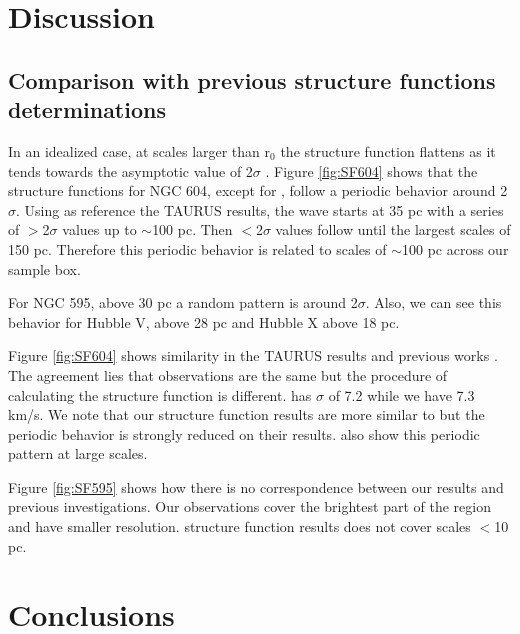 \documentclass[fleqn,usenatbib]{mnras}
\begin{document}
\clearpage


\section{Discussion}\label{sec:disc}

\subsection{Comparison with previous structure functions determinations}

In an idealized case, at scales larger than r$_{0}$ the structure function flattens as it tends towards the asymptotic value of 2$\sigma$ \citep{arthur2016turbulence}. Figure \ref{fig:SF604} shows that the structure functions for NGC 604, except for \cite{2019arXiv191203543M}, follow a periodic behavior around 2$\sigma$. Using as reference the TAURUS results, the wave starts at 35 pc with a series of $ >$2$\sigma$ values up to $\sim$100 pc. Then $<$2$\sigma$ values follow until the largest scales of 150 pc. Therefore this periodic behavior is related to scales of $\sim$100 pc across our sample box. 

For NGC 595, above 30 pc a random pattern is around 2$\sigma$. Also, we can see this behavior for Hubble V, above 28 pc and Hubble X above 18 pc.

Figure \ref{fig:SF604} shows similarity in the TAURUS results and previous works \citep{tanco1997,2019arXiv191203543M}. The agreement lies that observations are the same but the procedure of calculating the structure function is different. \citep{2019arXiv191203543M} has $\sigma$ of 7.2 while we have 7.3 km/s. We note that our structure function results are more similar to \cite{2019arXiv191203543M} but the periodic behavior is strongly reduced on their results. \citep{tanco1997} also show this periodic pattern at large scales.

Figure \ref{fig:SF595} shows how there is no correspondence between our results and previous investigations. Our observations cover the brightest part of the region and have smaller resolution. \citet{lagrois2011} structure function results does not cover scales $<$10 pc.



\section{Conclusions}\label{sec:concl}
\end{document}
